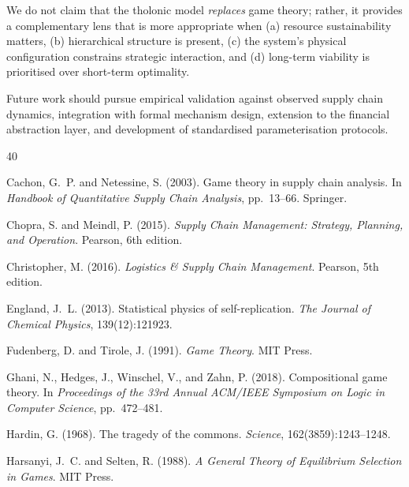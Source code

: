 \documentclass[12pt,a4paper,twocolumn]{article}
\begin{document}
We do not claim that the tholonic model \emph{replaces} game theory; rather, it provides a complementary lens that is more appropriate when (a) resource sustainability matters, (b) hierarchical structure is present, (c) the system's physical configuration constrains strategic interaction, and (d) long-term viability is prioritised over short-term optimality.

Future work should pursue empirical validation against observed supply chain dynamics, integration with formal mechanism design, extension to the financial abstraction layer, and development of standardised parameterisation protocols.

\begin{thebibliography}{40}

Cachon, G.~P. and Netessine, S. (2003).
\newblock Game theory in supply chain analysis.
\newblock In \emph{Handbook of Quantitative Supply Chain Analysis}, pp.~13--66. Springer.

Chopra, S. and Meindl, P. (2015).
\newblock \emph{Supply Chain Management: Strategy, Planning, and Operation}.
\newblock Pearson, 6th edition.

Christopher, M. (2016).
\newblock \emph{Logistics \& Supply Chain Management}.
\newblock Pearson, 5th edition.

England, J.~L. (2013).
\newblock Statistical physics of self-replication.
\newblock \emph{The Journal of Chemical Physics}, 139(12):121923.

Fudenberg, D. and Tirole, J. (1991).
\newblock \emph{Game Theory}.
\newblock MIT Press.

Ghani, N., Hedges, J., Winschel, V., and Zahn, P. (2018).
\newblock Compositional game theory.
\newblock In \emph{Proceedings of the 33rd Annual ACM/IEEE Symposium on Logic in Computer Science}, pp.~472--481.

Hardin, G. (1968).
\newblock The tragedy of the commons.
\newblock \emph{Science}, 162(3859):1243--1248.

Harsanyi, J.~C. and Selten, R. (1988).
\newblock \emph{A General Theory of Equilibrium Selection in Games}.
\newblock MIT Press.


\end{thebibliography}
\end{document}
